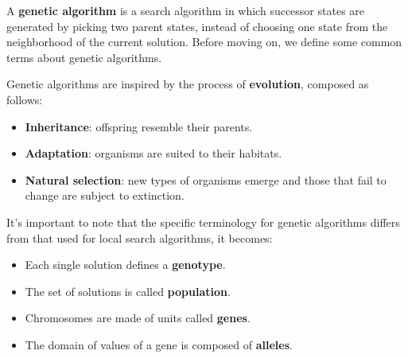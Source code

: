 A \textbf{genetic algorithm} is a search algorithm in which successor states are generated by picking two parent states, instead of choosing one state from the neighborhood of
the current solution. Before moving on, we define some common terms about genetic algorithms. \vspace{3.5pt}

Genetic algorithms are inspired by the process of \textbf{evolution}, composed as follows:
\begin{itemize}
    \renewcommand{\labelitemi}{-}
    \item \textbf{Inheritance}: offspring resemble their parents.
    \item \textbf{Adaptation}: organisms are suited to their habitats.
    \item \textbf{Natural selection}: new types of organisms emerge and those that fail to change are subject to extinction.
\end{itemize}

It's important to note that the specific terminology for genetic algorithms differs from that used for local search algorithms, it becomes:
\begin{itemize}
    \renewcommand{\labelitemi}{-}
    \item Each single solution defines a \textbf{genotype}.
    \item The set of solutions is called \textbf{population}.
    \item Chromosomes are made of units called \textbf{genes}.
    \item The domain of values of a gene is composed of \textbf{alleles}.
\end{itemize} \vspace{3.5pt}

